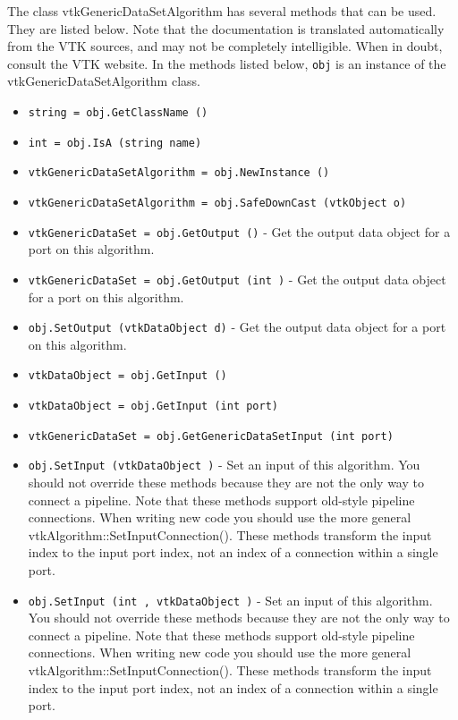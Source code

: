 The class vtkGenericDataSetAlgorithm has several methods that can be used.
  They are listed below.
Note that the documentation is translated automatically from the VTK sources,
and may not be completely intelligible.  When in doubt, consult the VTK website.
In the methods listed below, \verb|obj| is an instance of the vtkGenericDataSetAlgorithm class.
\begin{itemize}
\item  \verb|string = obj.GetClassName ()|

\item  \verb|int = obj.IsA (string name)|

\item  \verb|vtkGenericDataSetAlgorithm = obj.NewInstance ()|

\item  \verb|vtkGenericDataSetAlgorithm = obj.SafeDownCast (vtkObject o)|

\item  \verb|vtkGenericDataSet = obj.GetOutput ()| -  Get the output data object for a port on this algorithm.

\item  \verb|vtkGenericDataSet = obj.GetOutput (int )| -  Get the output data object for a port on this algorithm.

\item  \verb|obj.SetOutput (vtkDataObject d)| -  Get the output data object for a port on this algorithm.

\item  \verb|vtkDataObject = obj.GetInput ()|

\item  \verb|vtkDataObject = obj.GetInput (int port)|

\item  \verb|vtkGenericDataSet = obj.GetGenericDataSetInput (int port)|

\item  \verb|obj.SetInput (vtkDataObject )| -  Set an input of this algorithm. You should not override these
 methods because they are not the only way to connect a pipeline.
 Note that these methods support old-style pipeline connections.
 When writing new code you should use the more general
 vtkAlgorithm::SetInputConnection().  These methods transform the
 input index to the input port index, not an index of a connection
 within a single port.

\item  \verb|obj.SetInput (int , vtkDataObject )| -  Set an input of this algorithm. You should not override these
 methods because they are not the only way to connect a pipeline.
 Note that these methods support old-style pipeline connections.
 When writing new code you should use the more general
 vtkAlgorithm::SetInputConnection().  These methods transform the
 input index to the input port index, not an index of a connection
 within a single port.


\end{itemize}
